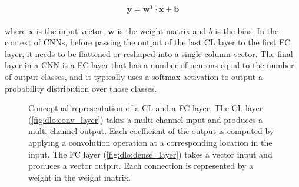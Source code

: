 \begin{equation}
  \label{eqn:dlo:fc_layer}
  \mathbf{y} = \mathbf{w}^T \cdot \mathbf{x} + \mathbf{b}
\end{equation}\\

\noindent where $\mathbf{x}$ is the input vector, $\mathbf{w}$ is the weight
matrix and $b$ is the bias. In the context of \acp{CNN}, before passing the
output of the last \ac{CL} layer to the first \ac{FC} layer, it needs to be
flattened or reshaped into a single column vector. The final layer in a \ac{CNN}
is a \ac{FC} layer that has a number of neurons equal to the number of output
classes, and it typically uses a softmax activation to output a probability
distribution over those classes.\\


\begin{figure}[htbp]
  \centering
    \caption{Conceptual representation of a \acl{CL} and a \acl{FC} layer. The
    \acl{CL} layer (\cref{fig:dlo:conv_layer}) takes a multi-channel input and
    produces a multi-channel output. Each coefficient of the output is computed
    by applying a convolution operation at a corresponding location in the
    input. The \acl{FC} layer (\cref{fig:dlo:dense_layer}) takes a vector input
    and produces a vector output. Each connection is represented by a weight in
    the weight matrix.}
  \label{fig:sota:layers}
\end{figure}

